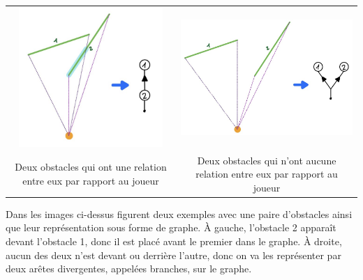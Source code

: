 \documentclass[11pt,french,a4paper,]{article}
\begin{document}
\begin{longtable}[]{@{}cc@{}}
\toprule
\endhead
\begin{minipage}[t]{0.47\columnwidth}\centering
\includegraphics[width=\textwidth,height=2.08333in]{../img/Graphs/graph_overlap1.png}\strut
\end{minipage} & \begin{minipage}[t]{0.47\columnwidth}\centering
\includegraphics[width=\textwidth,height=2.08333in]{../img/Graphs/graph_overlap2.png}\strut
\end{minipage}\tabularnewline
\begin{minipage}[t]{0.47\columnwidth}\centering
Deux obstacles qui ont une relation entre eux par rapport au
joueur\strut
\end{minipage} & \begin{minipage}[t]{0.47\columnwidth}\centering
Deux obstacles qui n'ont aucune relation entre eux par rapport au
joueur\strut
\end{minipage}\tabularnewline
\bottomrule
\end{longtable}

Dans les images ci-dessus figurent deux exemples avec une paire
d'obstacles ainsi que leur représentation sous forme de graphe. À
gauche, l'obstacle 2 apparaît devant l'obstacle 1, donc il est placé
avant le premier dans le graphe. À droite, aucun des deux n'est devant
ou derrière l'autre, donc on va les représenter par deux arêtes
divergentes, appelées branches, sur le graphe.
\end{document}
